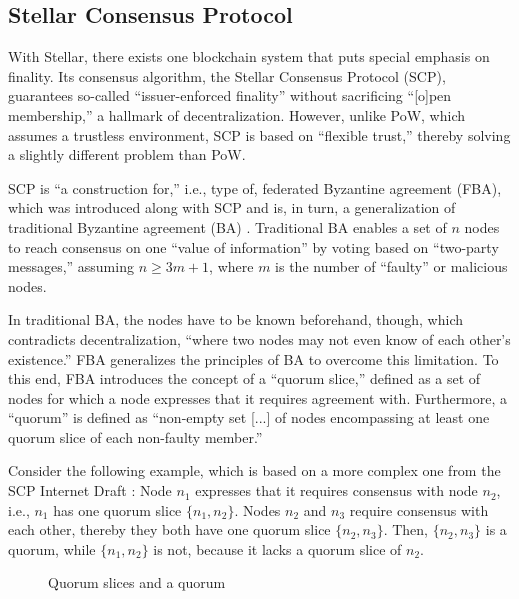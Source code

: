 \subsection{Stellar Consensus Protocol}

With Stellar, there exists one blockchain system that puts special emphasis on finality.
Its consensus algorithm, the Stellar Consensus Protocol (SCP), guarantees so-called ``issuer-enforced finality'' without sacrificing  ``[o]pen membership,'' \autocite[1]{lokhava2019} a hallmark of decentralization.
However, unlike PoW, which assumes a trustless environment, SCP is based on ``flexible trust,'' \autocite[2]{mazieres2016scp} thereby solving a slightly different problem than PoW.

SCP is ``a construction for,'' i.e., type of, federated Byzantine agreement (FBA), \autocite[2]{mazieres2016scp} which was introduced along with SCP and is, in turn, a generalization of traditional Byzantine agreement (BA) \autocite[5]{mazieres2016scp}.
Traditional BA enables a set of $n$ nodes to reach consensus on one ``value of information'' by voting based on ``two-party messages,'' assuming $n \geq 3m + 1$, where $m$ is the number of ``faulty'' or malicious nodes. \autocite{lamport1980}

In traditional BA, the nodes have to be known beforehand, though, which contradicts decentralization, ``where two nodes may not even know of each other’s existence.'' \autocite[4]{lokhava2019}
FBA generalizes the principles of BA to overcome this limitation.
To this end, FBA introduces the concept of a ``quorum slice,'' defined as  a set of nodes for which a node expresses that it requires agreement with. \autocite[4]{lokhava2019}
Furthermore, a ``quorum'' is defined as ``non-empty set [...] of nodes encompassing at least one quorum slice of each non-faulty member.'' \autocite[4]{lokhava2019}

Consider the following example, which is based on a more complex one from the SCP Internet Draft \autocite{ietf2018scp}:
Node $n_1$ expresses that it requires consensus with node $n_2$, i.e., $n_1$ has one quorum slice $\{n_1, n_2\}$.
Nodes $n_2$ and $n_3$ require consensus with each other, thereby they both have one quorum slice $\{n_2, n_3\}$.
Then, $\{n_2, n_3\}$ is a quorum, while $\{n_1, n_2\}$ is not, because it lacks a quorum slice of $n_2$.
\\
\begin{figure}[H]
	\centering
	
	\caption*{Quorum slices and a quorum}
\end{figure}

